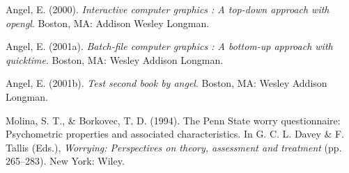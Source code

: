 \documentclass[12pt,oneside]{chicagocapstone}
\begin{document}
\hypertarget{refs}{}
\leavevmode\hypertarget{ref-angel2000}{}%
Angel, E. (2000). \emph{Interactive computer graphics : A top-down approach with opengl}. Boston, MA: Addison Wesley Longman.

\leavevmode\hypertarget{ref-angel2001}{}%
Angel, E. (2001a). \emph{Batch-file computer graphics : A bottom-up approach with quicktime}. Boston, MA: Wesley Addison Longman.

\leavevmode\hypertarget{ref-angel2002a}{}%
Angel, E. (2001b). \emph{Test second book by angel}. Boston, MA: Wesley Addison Longman.

\leavevmode\hypertarget{ref-Molina1994}{}%
Molina, S. T., \& Borkovec, T. D. (1994). The Penn State worry questionnaire: Psychometric properties and associated characteristics. In G. C. L. Davey \& F. Tallis (Eds.), \emph{Worrying: Perspectives on theory, assessment and treatment} (pp. 265--283). New York: Wiley.


\end{document}
